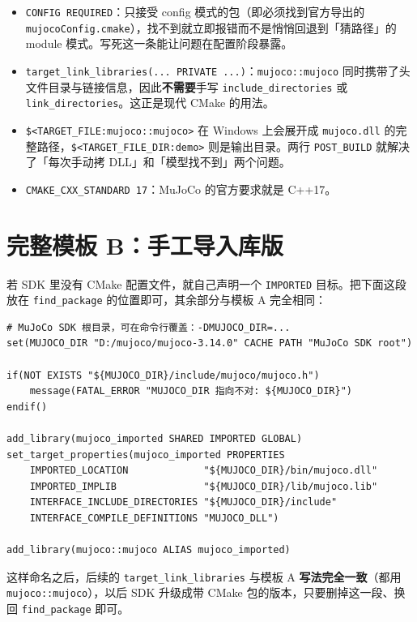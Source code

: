 \begin{itemize}
	\item \texttt{CONFIG REQUIRED}：只接受 config 模式的包（即必须找到官方导出的 \texttt{mujocoConfig.\allowbreak cmake}），找不到就立即报错而不是悄悄回退到「猜路径」的 module 模式。写死这一条能让问题在配置阶段暴露。
	\item \texttt{target\_link\_libraries(... PRIVATE ...)}：\texttt{mujoco::mujoco} 同时携带了头文件目录与链接信息，因此\textbf{不需要}手写 \texttt{include\_directories} 或 \texttt{link\_directories}。这正是现代 CMake 的用法。
	\item \texttt{\$<TARGET\_FILE:\allowbreak mujoco::\allowbreak mujoco>} 在 Windows 上会展开成 \texttt{mujoco.dll} 的完整路径，\texttt{\$<TARGET\_FILE\_DIR:\allowbreak demo>} 则是输出目录。两行 \texttt{POST\_BUILD} 就解决了「每次手动拷 DLL」和「模型找不到」两个问题。
	\item \texttt{CMAKE\_CXX\_STANDARD 17}：MuJoCo 的官方要求就是 C++17。
\end{itemize}

\section{完整模板 B：手工导入库版}

若 SDK 里没有 CMake 配置文件，就自己声明一个 \texttt{IMPORTED} 目标。把下面这段放在 \texttt{find\_package} 的位置即可，其余部分与模板 A 完全相同：

\begin{lstlisting}[style=cmake]
# MuJoCo SDK 根目录，可在命令行覆盖：-DMUJOCO_DIR=...
set(MUJOCO_DIR "D:/mujoco/mujoco-3.14.0" CACHE PATH "MuJoCo SDK root")

if(NOT EXISTS "${MUJOCO_DIR}/include/mujoco/mujoco.h")
    message(FATAL_ERROR "MUJOCO_DIR 指向不对: ${MUJOCO_DIR}")
endif()

add_library(mujoco_imported SHARED IMPORTED GLOBAL)
set_target_properties(mujoco_imported PROPERTIES
    IMPORTED_LOCATION             "${MUJOCO_DIR}/bin/mujoco.dll"
    IMPORTED_IMPLIB               "${MUJOCO_DIR}/lib/mujoco.lib"
    INTERFACE_INCLUDE_DIRECTORIES "${MUJOCO_DIR}/include"
    INTERFACE_COMPILE_DEFINITIONS "MUJOCO_DLL")

add_library(mujoco::mujoco ALIAS mujoco_imported)
\end{lstlisting}

这样命名之后，后续的 \texttt{target\_link\_libraries} 与模板 A \textbf{写法完全一致}（都用 \texttt{mujoco::mujoco}），以后 SDK 升级成带 CMake 包的版本，只要删掉这一段、换回 \texttt{find\_package} 即可。

